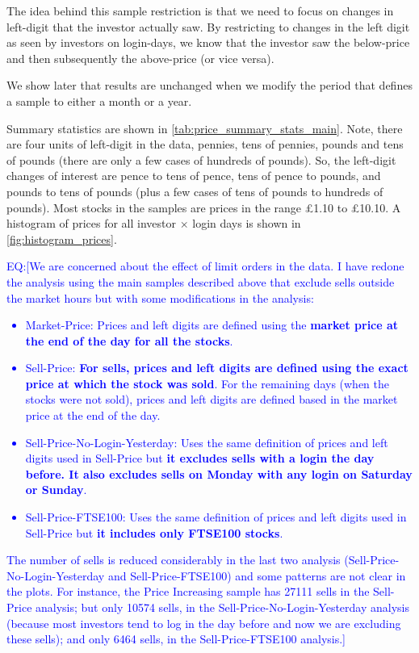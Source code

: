 \documentclass[
	USenglish,12pt,paper=a4,numbers=noenddot,abstract=on,
	final,%
	fullsample,
    ]{scrartcl}
\begin{document}
The idea behind this sample restriction is that we need to focus on changes in left-digit that the investor actually saw. By restricting to changes in the left digit as seen by investors on login-days, we know that the investor saw the below-price and then subsequently the above-price (or vice versa).

We show later that results are unchanged when we modify the period that defines a sample to either a month or a year. 

Summary statistics are shown in \ref{tab:price_summary_stats_main}. Note, there are four units of left-digit in the data, pennies, tens of pennies, pounds and tens of pounds (there are only a few cases of hundreds of pounds). So, the left-digit changes of interest are pence to tens of pence, tens of pence to pounds, and pounds to tens of pounds (plus a few cases of tens of pounds to hundreds of pounds). Most stocks in the samples are prices in the range \pounds1.10 to \pounds10.10. A histogram of prices for all investor $\times$ login days is shown in \ref{fig:histogram_prices}.


\textcolor{blue}{EQ:[We are concerned about the effect of limit orders in the data. I have redone the analysis using the main samples described above that exclude sells outside the market hours but with some modifications in the analysis: \\
	\begin{itemize}
		\item Market-Price: Prices and left digits are defined using the \textbf{market price at the end of the day for all the stocks}.
		\item Sell-Price: \textbf{For sells, prices and left digits are defined using the exact price at which the stock was sold}. For the remaining days (when the stocks were not sold), prices and left digits are defined based in the market price at the end of the day.
		\item Sell-Price-No-Login-Yesterday: Uses the same definition of prices and left digits used in Sell-Price but \textbf{it excludes sells with a login the day before. It also excludes sells on Monday with any login on Saturday or Sunday}.
		\item Sell-Price-FTSE100: Uses the same definition of prices and left digits used in Sell-Price but \textbf{it includes only FTSE100 stocks}.
	\end{itemize}
The number of sells is reduced considerably in the last two analysis (Sell-Price-No-Login-Yesterday and Sell-Price-FTSE100) and some patterns are not clear in the plots. For instance, the Price Increasing sample has 27111 sells in the Sell-Price analysis; but only 10574 sells, in the Sell-Price-No-Login-Yesterday analysis (because most investors tend to log in the day before and now we are excluding these sells); and only 6464 sells, in the Sell-Price-FTSE100 analysis.] }	
\end{document}
